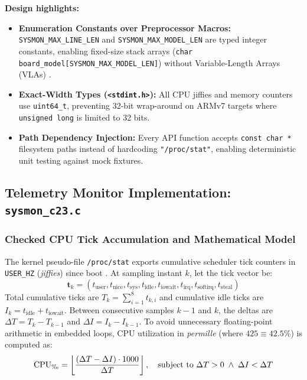 \documentclass[11pt,a4paper]{article}
\begin{document}
\textbf{Design highlights:}
\begin{itemize}
\item \textbf{Enumeration Constants over Preprocessor Macros:} \texttt{SYSMON\_MAX\_LINE\_LEN} and \texttt{SYSMON\_MAX\_MODEL\_LEN} are typed integer constants, enabling fixed-size stack arrays (\texttt{char board\_model[SYSMON\_MAX\_MODEL\_LEN]}) without Variable-Length Arrays (VLAs) \cite{misra2025}.
\item \textbf{Exact-Width Types (\texttt{<stdint.h>}):} All CPU jiffies and memory counters use \texttt{uint64\_t}, preventing 32-bit wrap-around on ARMv7 targets where \texttt{unsigned long} is limited to 32 bits.
\item \textbf{Path Dependency Injection:} Every API function accepts \texttt{const char *} filesystem paths instead of hardcoding \texttt{"/proc/stat"}, enabling deterministic unit testing against mock fixtures.
\end{itemize}

\subsection{Telemetry Monitor Implementation: \texttt{sysmon\_c23.c}}

\subsubsection{Checked CPU Tick Accumulation and Mathematical Model}

The kernel pseudo-file \texttt{/proc/stat} exports cumulative scheduler tick counters in \texttt{USER\_HZ} (\emph{jiffies}) since boot \cite{man_proc_stat,love2010}. At sampling instant $k$, let the tick vector be:
\[
\mathbf{t}_k = (t_{\text{user}}, t_{\text{nice}}, t_{\text{sys}}, t_{\text{idle}}, t_{\text{iowait}}, t_{\text{irq}}, t_{\text{softirq}}, t_{\text{steal}})
\]
Total cumulative ticks are $T_k = \sum_{i=1}^{8} t_{k,i}$ and cumulative idle ticks are $I_k = t_{\text{idle}} + t_{\text{iowait}}$. Between consecutive samples $k-1$ and $k$, the deltas are $\Delta T = T_k - T_{k-1}$ and $\Delta I = I_k - I_{k-1}$. To avoid unnecessary floating-point arithmetic in embedded loops, CPU utilization in \emph{permille} (where $425 \equiv 42.5\%$) is computed as:
\begin{equation}
\text{CPU}_{\text{\textperthousand}} = \left\lfloor \frac{(\Delta T - \Delta I) \cdot 1000}{\Delta T} \right\rfloor, \quad \text{subject to } \Delta T > 0 \;\land\; \Delta I < \Delta T
\end{equation}
\end{document}
